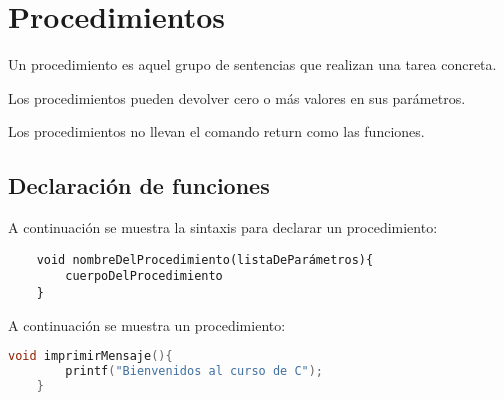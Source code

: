 \chapter[Procedimientos]{Procedimientos}
\raggedright
Un procedimiento es aquel grupo de sentencias que realizan una tarea concreta.

\vspace{1em}
Los procedimientos pueden devolver cero o más valores en sus parámetros.

\vspace{1em}
{Los procedimientos no llevan el comando return como las funciones.}

\section[Declaración]{Declaración de funciones}
A continuación se muestra la sintaxis para declarar un procedimiento:

\begin{verbatim}
	void nombreDelProcedimiento(listaDeParámetros){
		cuerpoDelProcedimiento
	}
\end{verbatim}

A continuación se muestra un procedimiento:

\begin{lstlisting}[language=C, caption={Función que suma dos números y devuelve el resultado}, style=codigoenc]
	void imprimirMensaje(){
		printf("Bienvenidos al curso de C");
	}
\end{lstlisting}
